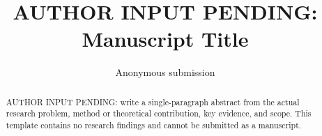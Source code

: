 \documentclass[letterpaper]{article}
\title{AUTHOR INPUT PENDING: Manuscript Title}\author{Anonymous submission}\affiliations{Anonymous submission}
\begin{document}
\maketitle
\begin{abstract}
AUTHOR INPUT PENDING: write a single-paragraph abstract from the actual research problem,
method or theoretical contribution, key evidence, and scope. This template contains
no research findings and cannot be submitted as a manuscript.
\end{abstract}


\clearpage

\end{document}
